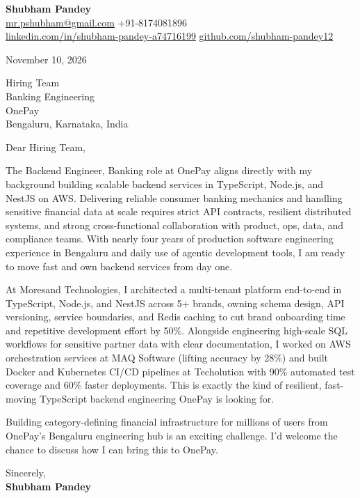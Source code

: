 \documentclass[a4paper,11pt]{article}
\begin{document}
\textbf{\Large Shubham Pandey}\\
\href{mailto:mr.pshubham@gmail.com}{mr.pshubham@gmail.com} \quad +91-8174081896\\
\href{https://www.linkedin.com/in/shubham-pandey-a74716199/}{linkedin.com/in/shubham-pandey-a74716199} \quad
\href{https://github.com/shubham-pandey12}{github.com/shubham-pandey12}

\vspace{1em}
November 10, 2026

\vspace{1em}
Hiring Team\\
Banking Engineering\\
OnePay\\
Bengaluru, Karnataka, India

\vspace{1em}
Dear Hiring Team,

The Backend Engineer, Banking role at OnePay aligns directly with my background building scalable backend services in TypeScript, Node.js, and NestJS on AWS. Delivering reliable consumer banking mechanics and handling sensitive financial data at scale requires strict API contracts, resilient distributed systems, and strong cross-functional collaboration with product, ops, data, and compliance teams. With nearly four years of production software engineering experience in Bengaluru and daily use of agentic development tools, I am ready to move fast and own backend services from day one.

At Moresand Technologies, I architected a multi-tenant platform end-to-end in TypeScript, Node.js, and NestJS across 5+ brands, owning schema design, API versioning, service boundaries, and Redis caching to cut brand onboarding time and repetitive development effort by 50\%. Alongside engineering high-scale SQL workflows for sensitive partner data with clear documentation, I worked on AWS orchestration services at MAQ Software (lifting accuracy by 28\%) and built Docker and Kubernetes CI/CD pipelines at Techolution with 90\% automated test coverage and 60\% faster deployments. This is exactly the kind of resilient, fast-moving TypeScript backend engineering OnePay is looking for.

Building category-defining financial infrastructure for millions of users from OnePay's Bengaluru engineering hub is an exciting challenge. I'd welcome the chance to discuss how I can bring this to OnePay.

\vspace{1em}
Sincerely,\\[0.5em]
\textbf{Shubham Pandey}
\end{document}
